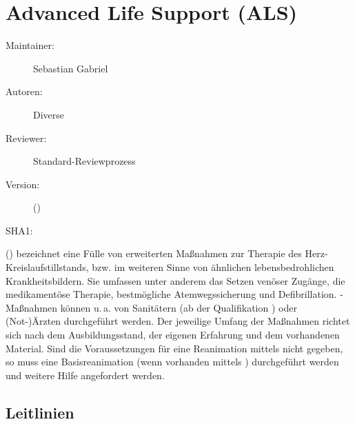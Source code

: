 % 
\def\ChapterCode{ALS}
\chapter
[\CO{[ALS]} Advanced Life Support (ALS)]
{Advanced Life Support (ALS)}
\label{chp:ALS}

\ChapterIntro
{%
}
{%
\begin{description}
  \item[Maintainer:] Sebastian Gabriel
  \item[Autoren:] Diverse
  \item[Reviewer:] Standard-Reviewprozess
  \item[Version:] {\DocVersion} ({\DocVersionInfo})
  \item[SHA1:] {\DocGitCommit}
\end{description}

{\TxTeilkapitelAASS}
}


\clearpage %
 () bezeichnet eine Fülle
von erweiterten Maßnahmen zur Therapie des
Herz-Kreislaufstillstands, bzw. im weiteren Sinne von
ähnlichen lebensbedrohlichen Krankheitsbildern. Sie umfassen
unter anderem das Setzen venöser Zugänge, die medikamentöse
Therapie, bestmögliche Atemwegssicherung und Defibrillation.
-Maßnahmen können 
u.\,a. von Sanitätern (ab der Qualifikation ) oder
(Not-)Ärzten durchgeführt werden. Der jeweilige Umfang der Maßnahmen
richtet sich nach dem Ausbildungsstand, der eigenen
Erfahrung und dem vorhandenen Material. Sind die
Voraussetzungen für eine Reanimation mittels 
nicht gegeben, so muss eine Basisreanimation (wenn
vorhanden mittels ) durchgeführt werden und weitere
Hilfe angefordert werden. 

\section{Leitlinien}

